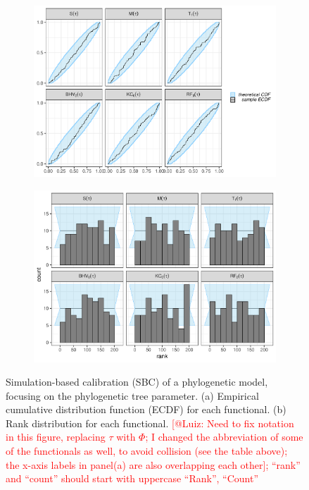 \documentclass[oneside]{article}
\begin{document}
\begin{figure}
  \centering
  \vspace{0pt}
  \begin{subfigure}[t]{\textwidth}
    \caption{}
    \centering
    \includegraphics[scale=0.5]{../figures/ECDFs_SBC.pdf} 
  \end{subfigure}
  \vspace{0pt}
  \hspace{1cm}
  \begin{subfigure}[t]{\textwidth}
    \caption{}
    \centering
    \includegraphics[scale=0.5]{../figures/hists_SBC.pdf}    
  \end{subfigure}
  \hfill
   \caption{Simulation-based calibration (SBC) of a phylogenetic
     model, focusing on the phylogenetic tree parameter.
     (a) Empirical cumulative distribution function (ECDF) for each
     functional.
     (b) Rank distribution for each functional.
   \textcolor{red}{[@Luiz: Need to fix notation in this figure,
     replacing $\tau$ with $\Phi$; I changed the abbreviation of some
     of the functionals as well, to avoid collision (see the table
     above);
     the x-axis labels in panel(a)
     are also overlapping each other]; ``rank'' and ``count''
     should start with uppercase ``Rank'', ``Count''}}
   \label{supfig:sbc}
\end{figure}
\end{document}
